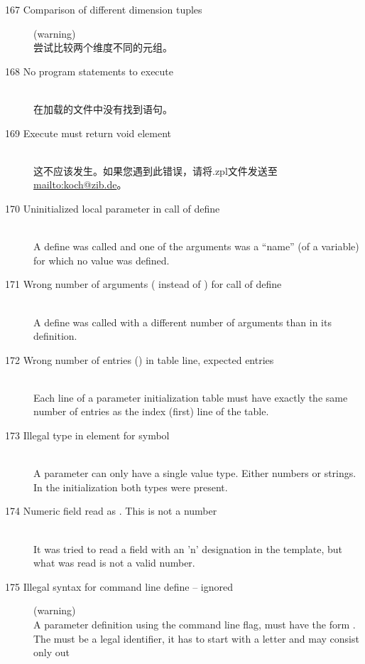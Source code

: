 \begin{description}
\item[167 Comparison of different dimension tuples] (warning)\ \\
  尝试比较两个维度不同的元组。
%
%
\item[168 No program statements to execute]\ \\
  在加载的文件中没有找到\zimpl 语句。
%
%
\item[169 Execute must return void element]\ \\
  这不应该发生。如果您遇到此错误，请将.zpl文件发送至\url{mailto:koch@zib.de}。
%
%
\item[170 Uninitialized local parameter  in call of
  define ]\ \\
  A define was called and one of the arguments was a ``name'' 
  (of a variable) for which no value was defined.
\item[171 Wrong number of arguments ( instead of )
  for call of define ]\ \\
  A define was called with a different number of arguments than in
  its definition.
\item[172 Wrong number of entries () in table line, 
  expected  entries]\ \\
  Each line of a parameter initialization table must have
  exactly the same number of entries as the index (first) line of
  the table.
\item[173 Illegal type in element  for symbol]\ \\
  A parameter can only have a single value type. Either numbers or
  strings. In the initialization both types were present.
%
%
\item[174 Numeric field  read as . This is not a
  number]\ \\
  It was tried to read a field with an 'n' designation in the template,
  but what was read is not a valid number.
%
%
\item[175 Illegal syntax for command line define  --
  ignored] (warning)\\
  A parameter definition using the command line  flag, must
  have the form . The  must be a legal
  identifier, \ie it has to start with a letter and may consist only out

\end{description}
